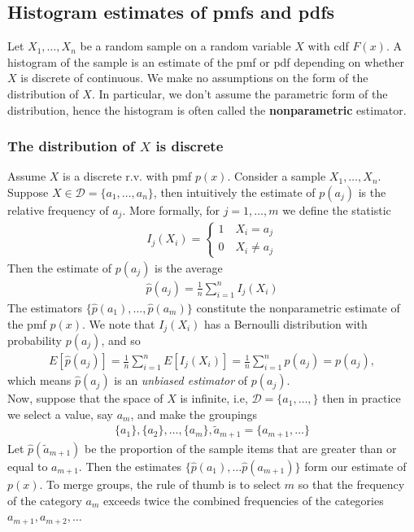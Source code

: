 \documentclass{book}
\theoremstyle{definition}
\newcommand{\f}[2]{\frac{#1}{#2}}
\begin{document}
\subsection{Histogram estimates of pmfs and pdfs}


Let $X_1,\dots,X_n$ be a random sample on a random variable $X$ with cdf $F(x)$. A histogram of the sample is an estimate of the pmf or pdf depending on whether $X$ is discrete of continuous. We make no assumptions on the form of the distribution of $X$. In particular, we don't assume the parametric form of the distribution, hence the histogram is often called the \textbf{nonparametric} estimator. 







\subsubsection{The distribution of $X$ is discrete}

Assume $X$ is a discrete r.v. with pmf $p(x)$. Consider a sample $X_1,\dots,X_n$. Suppose $X \in \mathcal{D} = \{ a_1,\dots, a_n \}$, then intuitively the estimate of $p(a_j)$ is the relative frequency of $a_j$. More formally, for $j = 1,\dots,m$ we define the statistic
\begin{align}
I_j(X_i) = \begin{cases}
1 \quad X_i = a_j\\ 0 \quad X_i \neq a_j
\end{cases}
\end{align} 
Then the estimate of $p(a_j)$ is the average
\begin{align}
{\hat{p}(a_j) = \f{1}{n}\sum^n_{i=1}I_j(X_i)}
\end{align}
The estimators $\{ \hat{p}(a_1),\dots, \hat{p}(a_m) \}$ constitute the nonparametric estimate of the pmf $p(x)$. We note that $I_j(X_i)$ has a Bernoulli distribution with probability $p(a_j)$, and so
\begin{align}
E[\hat{p}(a_j)] = \f{1}{n}\sum^n_{i=1}E[I_j(X_i)] = \f{1}{n}\sum^n_{i=1}p(a_j) = p(a_j),
\end{align}
which means $\hat{p}(a_j)$ is an \textit{unbiased estimator} of $p(a_j)$. \\

Now, suppose that the space of $X$ is infinite, i.e, $\mathcal{D} = \{ a_1, \dots, \}$ then in practice we select a value, say $a_m$, and make the groupings
\begin{align}
\{a_1\}, \{a_2\}, \dots, \{a_m\}, \tilde{a}_{m+1} = \{ a_{m+1}, \dots \}
\end{align}
Let $\hat{p}(\tilde{a}_{m+1})$ be the proportion of the sample items that are greater than or equal to $a_{m+1}$. Then the estimates $\{ \hat{p}(a_1),\dots \hat{p}(a_{m+1}) \}$ form our estimate of $p(x)$. To merge groups, the rule of thumb is to select $m$ so that the frequency of the category $a_m$ exceeds twice the combined frequencies of the categories $a_{m+1}, a_{m+2}, \dots$\\
\end{document}
